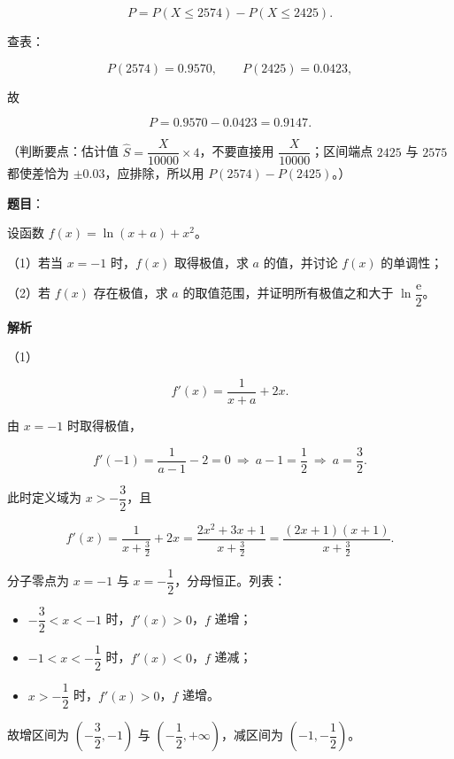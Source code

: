 \begin{answer}
\nopagebreak[4]
\[P=P(X\leqslant2574)-P(X\leqslant2425).\]

查表：

\nopagebreak[4]
\[P(2574)=0.9570,\qquad P(2425)=0.0423,\]

故

\nopagebreak[4]
\[P=0.9570-0.0423=0.9147.\]

（判断要点：估计值 $\hat S=\dfrac{X}{10000}\times4$，不要直接用 $\dfrac{X}{10000}$；区间端点 $2425$ 与 $2575$ 都使差恰为 $\pm0.03$，应排除，所以用 $P(2574)-P(2425)$。）


\end{answer}
\begin{answer}

\textbf{题目}：

设函数 $f(x)=\ln(x+a)+x^2$。

（1）若当 $x=-1$ 时，$f(x)$ 取得极值，求 $a$ 的值，并讨论 $f(x)$ 的单调性；

（2）若 $f(x)$ 存在极值，求 $a$ 的取值范围，并证明所有极值之和大于 $\ln\dfrac{\mathrm e}{2}$。

\textbf{解析}

（1）

\nopagebreak[4]
\[f'(x)=\frac1{x+a}+2x.\]

由 $x=-1$ 时取得极值，

\nopagebreak[4]
\[f'(-1)=\frac1{a-1}-2=0\ \Rightarrow\ a-1=\frac12\ \Rightarrow\ a=\frac32.\]

此时定义域为 $x>-\dfrac32$，且

\nopagebreak[4]
\[f'(x)=\frac1{x+\frac32}+2x=\frac{2x^2+3x+1}{x+\frac32}=\frac{(2x+1)(x+1)}{x+\frac32}.\]

分子零点为 $x=-1$ 与 $x=-\dfrac12$，分母恒正。列表：

\begin{itemize}
\item $-\dfrac32<x<-1$ 时，$f'(x)>0$，$f$ 递增；
\item $-1<x<-\dfrac12$ 时，$f'(x)<0$，$f$ 递减；
\item $x>-\dfrac12$ 时，$f'(x)>0$，$f$ 递增。
\end{itemize}

故增区间为 $\left(-\dfrac32,-1\right)$ 与 $\left(-\dfrac12,+\infty\right)$，减区间为 $\left(-1,-\dfrac12\right)$。


\end{answer}
